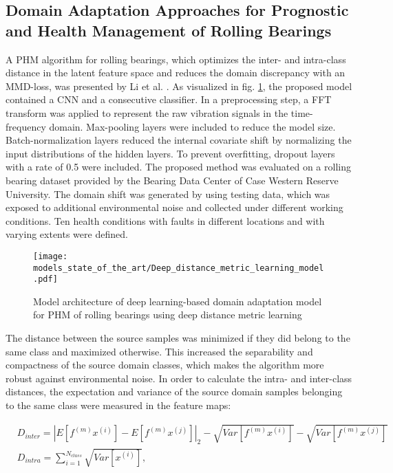 \subsection{Domain Adaptation Approaches for Prognostic and Health Management of Rolling Bearings}

A PHM algorithm for rolling bearings, which optimizes the inter- and intra-class distance in the latent feature space and reduces the domain discrepancy with an MMD-loss, was presented by Li et al. \cite{Li2018}. As visualized in fig. \ref{fig:Deep_distance_metric_learning_model}, the proposed model contained a CNN and a consecutive classifier. In a preprocessing step, a FFT transform was applied to represent the raw vibration signals in the time-frequency domain. Max-pooling layers were included to reduce the model size. Batch-normalization layers reduced the internal covariate shift by normalizing the input distributions of the hidden layers. To prevent overfitting, dropout layers with a rate of 0.5 were included. The proposed method was evaluated on a rolling bearing dataset provided by the Bearing Data Center of Case Western Reserve University. The domain shift was generated by using testing data, which was exposed to additional environmental noise and collected under different working conditions. Ten health conditions with faults in different locations and with varying extents were defined. 

\begin{figure}[H]
  \centering
  \texttt{[image: models\_state\_of\_the\_art/Deep\_distance\_metric\_learning\_model.pdf]}
  \caption{Model architecture of deep learning-based domain adaptation model for PHM of rolling bearings using deep distance metric learning \cite{Li2018}}
  \label{fig:Deep_distance_metric_learning_model}
\end{figure}

The distance between the source samples was minimized if they did belong to the same class and maximized otherwise. This increased the separability and compactness of the source domain classes, which makes the algorithm more robust against environmental noise. In order to calculate the intra- and inter-class distances, the expectation and variance of the source domain samples belonging to the same class were measured in the feature maps:

\begin{equation}
    \begin{aligned}
       &D_{inter} = |E[f^{(m)}x^{(i)}]-E[f^{(m)}x^{(j)}]|_{2}-\sqrt{Var[f^{(m)}x^{(i)}]}-\sqrt{Var[f^{(m)}x^{(j)}]}\\
       &D_{intra} = 
        \sum_{i=1}^{N_{class}} \sqrt{Var[x^{(i)}]},
    \end{aligned}
\end{equation}

